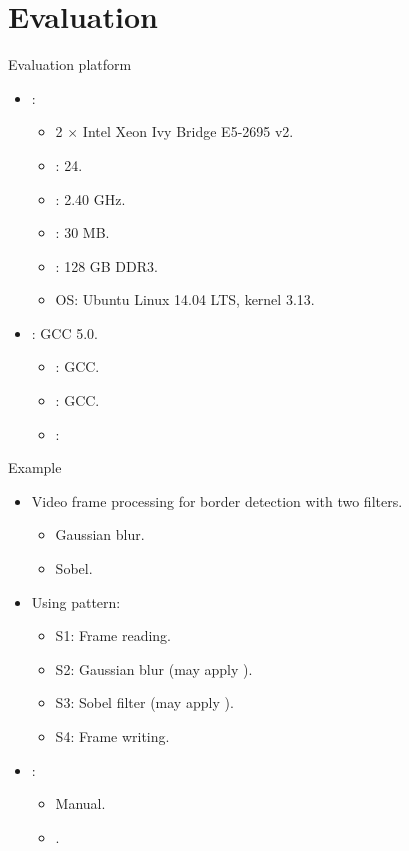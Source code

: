 \section{Evaluation}

\begin{frame}[t]{Evaluation platform}
\begin{itemize}
  \item {}:
    \begin{itemize}
      \item 2 $\times$ Intel Xeon Ivy Bridge E5-2695 v2.
      \item {}: 24.
      \item {}: 2.40 GHz.
      \item {}: 30 MB.
      \item {}: 128 GB DDR3.
      \item OS: Ubuntu Linux 14.04 LTS, kernel 3.13.
    \end{itemize}

  \vfill
  \item {}: GCC 5.0.
    \begin{itemize}
      \item {}: GCC.
      \item {}: GCC.
      \item {}: 
    \end{itemize}
\end{itemize}
\end{frame}

\begin{frame}[t]{Example}
\begin{itemize}
  \item Video frame processing for border detection with two filters.
    \begin{itemize}
      \item Gaussian blur.
      \item Sobel.
    \end{itemize}
  \vfill\pause
  \item Using  pattern:
    \begin{itemize}
      \item S1: Frame reading.
      \item S2: Gaussian blur (may apply ).
      \item S3: Sobel filter (may apply ).
      \item S4: Frame writing.
    \end{itemize}
  \vfill\pause
  \item {}:
    \begin{itemize}
      \item Manual.
      \item {}.
    \end{itemize}
\end{itemize}
\end{frame}

